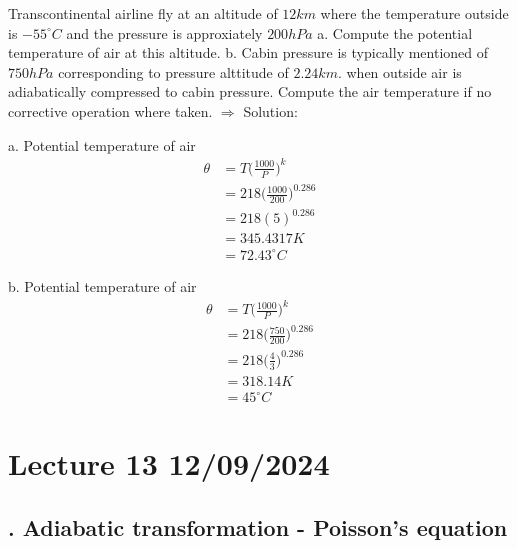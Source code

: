 \documentclass[fleqn,10pt]{SelfArx} %
\begin{document}
\begin{question}[q:12.1]{Transcontinental airline fly at an altitude of $12 km$ where the temperature outside is $-55^{\circ}C$ and the pressure is approxiately $200 hPa$ \newline
    a. Compute the potential temperature of air at this altitude. \newline
    b. Cabin pressure is typically mentioned of $750 hPa$ corresponding to pressure alttitude of $2.24 km$. when outside air is adiabatically compressed to cabin pressure$.$ Compute the air temperature if no corrective operation where taken.
}
$\Rightarrow$ Solution:

a. Potential temperature of air 
\begin{align*}
    \theta &= T \Big(\frac{1000}{P}\Big)^k \\ 
           &= 218 \Big(\frac{1000}{200}\Big)^{0.286}\\ 
           &= 218 (5)^{0.286}\\ 
           &= 345.4317 K \\
           &= 72.43 ^\circ C
\end{align*}

b. Potential temperature of air 
\begin{align*}
    \theta &= T \Big(\frac{1000}{P}\Big)^k \\ 
           &= 218 \Big(\frac{750}{200}\Big)^{0.286}\\ 
           &= 218 \Big(\frac{4}{3}\Big)^{0.286}\\ 
           &= 318.14 K \\
           &= 45 ^\circ C
\end{align*}
\end{question}

\clearpage

\section{Lecture 13 12/09/2024}
\subsection{. Adiabatic transformation - Poisson's equation}
\end{document}
